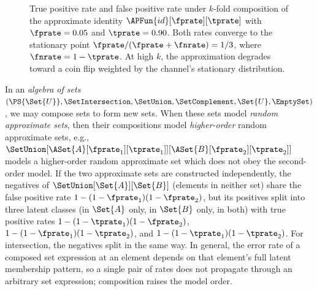 \begin{figure}[ht]
\centering
{}
\caption{True positive rate and false positive rate under $k$-fold
composition of the approximate identity
$\APFun{id}[\fprate][\tprate]$ with $\fprate = 0.05$ and $\tprate = 0.90$.
Both rates converge to the stationary point
$\fprate/(\fprate + \fnrate) = 1/3$, where $\fnrate = 1 - \tprate$.
At high $k$, the approximation degrades toward a coin flip weighted by the
channel's stationary distribution.}
\label{fig:kfold_composition}
\end{figure}

In an \emph{algebra of sets} $(\PS{\Set{U}}, \SetIntersection, \SetUnion, \SetComplement, \Set{U}, \EmptySet)$, we may compose sets to form new sets.
When these sets model \emph{random approximate sets}, then their compositions model \emph{higher-order} random approximate sets, e.g.,
$\SetUnion[\ASet{A}[\fprate_1][\tprate_1]][\ASet{B}[\fprate_2][\tprate_2]]$
models a higher-order random approximate set which does not obey the second-order model.
If the two approximate sets are constructed independently, the negatives of $\SetUnion[\Set{A}][\Set{B}]$ (elements in neither set) share the false positive rate $1-(1-\fprate_1)(1-\fprate_2)$, but its positives split into three latent classes (in $\Set{A}$ only, in $\Set{B}$ only, in both) with true positive rates $1-(1-\tprate_1)(1-\fprate_2)$, $1-(1-\fprate_1)(1-\tprate_2)$, and $1-(1-\tprate_1)(1-\tprate_2)$.
For intersection, the negatives split in the same way.
In general, the error rate of a composed set expression at an element depends on that element's full latent membership pattern, so a single pair of rates does not propagate through an arbitrary set expression; composition raises the model order.

